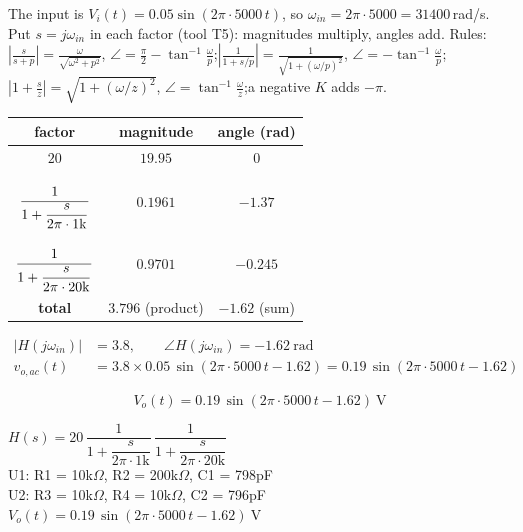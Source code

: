 \documentclass[11pt]{article}
\begin{document}
The input is $V_i(t) = 0.05\sin\left(2\pi\cdot 5000\,t\right)$, so $\omega_{in} = 2\pi\cdot 5000 = 31400$\,rad/s. Put $s=j\omega_{in}$ in each factor (tool T5): magnitudes multiply, angles add.
{\small Rules: $\left|\frac{s}{s+p}\right| = \frac{\omega}{\sqrt{\omega^2+p^2}}$, $\angle = \frac{\pi}{2}-\tan^{-1}\frac{\omega}{p}$;\quad $\left|\frac{1}{1+s/p}\right| = \frac{1}{\sqrt{1+(\omega/p)^2}}$, $\angle = -\tan^{-1}\frac{\omega}{p}$;\quad $\left|1+\frac{s}{z}\right| = \sqrt{1+(\omega/z)^2}$, $\angle = \tan^{-1}\frac{\omega}{z}$;\quad a negative $K$ adds $-\pi$.}
\begin{center}\renewcommand{\arraystretch}{1.35}
\begin{tabular}{ccc}
\toprule
factor & magnitude & angle (rad) \\
\midrule
$20$ & $19.95$ & $0$ \\
$\rule[-1.7em]{0pt}{4em}\dfrac{1}{1+\dfrac{s}{2\pi\cdot 1\mathrm{k}}}$ & $0.1961$ & $-1.37$ \\
$\rule[-1.7em]{0pt}{4em}\dfrac{1}{1+\dfrac{s}{2\pi\cdot 20\mathrm{k}}}$ & $0.9701$ & $-0.245$ \\
\textbf{total} & $\mathbf{3.796}$ (product) & $\mathbf{-1.62}$ (sum) \\
\bottomrule
\end{tabular}\end{center}

\begin{align*}
|H(j\omega_{in})| &= 3.8, \qquad \angle H(j\omega_{in}) = -1.62\ \mathrm{rad} \\
v_{o,ac}(t) &= 3.8\times 0.05\,\sin\left(2\pi\cdot 5000\,t - 1.62\right) = 0.19\,\sin\left(2\pi\cdot 5000\,t - 1.62\right)
\end{align*}

\[
\boxed{V_o(t) = 0.19\,\sin\left(2\pi\cdot 5000\,t - 1.62\right)\ \mathrm{V}}
\]

\begin{ansbox}
$H(s) = 20\,\dfrac{1}{1+\dfrac{s}{2\pi\cdot 1\mathrm{k}}}\,\dfrac{1}{1+\dfrac{s}{2\pi\cdot 20\mathrm{k}}}$\\[4pt]
U1: R1 = 10k$\Omega$, R2 = 200k$\Omega$, C1 = 798pF\\
U2: R3 = 10k$\Omega$, R4 = 10k$\Omega$, C2 = 796pF\\[4pt]
$V_o(t) = 0.19\,\sin\left(2\pi\cdot 5000\,t - 1.62\right)\ \mathrm{V}$
\end{ansbox}

\newpage
\end{document}
